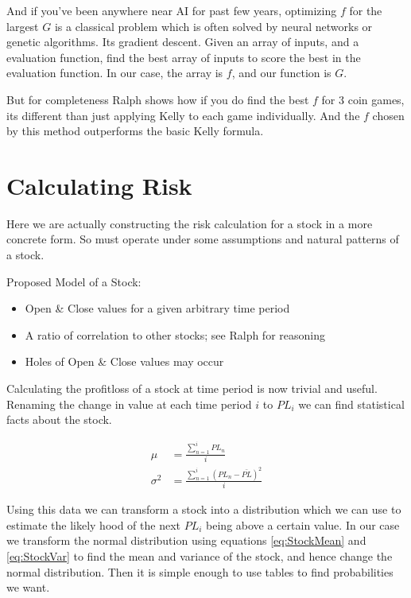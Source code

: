 \documentclass[12pt]{article}
\begin{document}
    And if you've been anywhere near AI for past few years, optimizing \(f\) for the largest 
    \(G\) is a classical problem which is often solved by neural networks or genetic
    algorithms. Its gradient descent. Given an array of inputs, and a evaluation function,
    find the best array of inputs to score the best in the evaluation function. In our case,
    the array is \(f\), and our function is \(G\).

    But for completeness Ralph\cite{Ralph} shows how if you do find the best \(f\) for 3 coin
    games, its different than just applying Kelly to each game individually. And the \(f\)
    chosen by this method outperforms the basic Kelly formula.

\section{Calculating Risk}

    Here we are actually constructing the risk calculation for a stock in a more concrete form.
    So must operate under some assumptions and natural patterns of a stock. 

    Proposed Model of a Stock: 
    \begin{itemize}
        \item{Open {\&} Close values for a given arbitrary time period}
        \item{A ratio of correlation to other stocks; see Ralph \cite{Ralph} for reasoning}
        \item{Holes of Open {\&} Close values may occur}
    \end{itemize}

    Calculating the profit{\/}loss of a stock at time period is now trivial and useful.
    Renaming the change in value at each time period \(i\) to \(PL_i\) we can find
    statistical facts about the stock.

    \begin{align}
        \mu &= \frac{\sum^{i}_{n=1} PL_n}{i} \label{eq:StockMean} \\
        \sigma^2 &= \frac{\sum^{i}_{n=1} (PL_n - \bar{PL})^2}{i} \label{eq:StockVar}
    \end{align}

    Using this data we can transform a stock into a distribution which we can use to estimate
    the likely hood of the next \(PL_i\) being above a certain value. In our case we transform
    the normal distribution using equations \ref{eq:StockMean} and \ref{eq:StockVar} to find
    the mean and variance of the stock, and hence change the normal distribution. Then it is
    simple enough to use tables to find probabilities we want.
\end{document}
